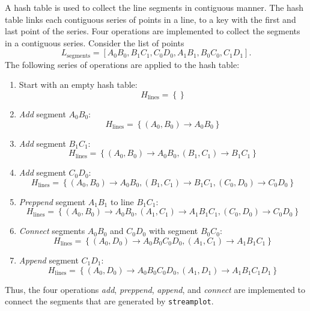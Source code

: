 \documentclass[english, a4paper]{article}
\begin{document}
A hash table is used to collect the line segments in contiguous manner. The hash table links each contiguous series of points in a line, to a key with the first and last point of the series. Four operations are implemented to collect the segments in a contiguous series. Consider the list of points
\begin{equation}
	L_{\mathrm{segments}} = \left[ A_{0}B_{0}, B_{1} C_{1}, C_{0}D_{0}, A_{1}B_{1}, B_{0}C_{0}, C_{1} D_{1} \right].
\end{equation}
The following series of operations are applied to the hash table:
\begin{enumerate}
\item Start with an empty hash table:
	\begin{equation}
		H_{\mathrm{lines}} = \left\{ \right\}
	\end{equation}
\item \emph{Add} segment $A_{0} B_{0}$:
	\begin{equation}
		H_{\mathrm{lines}} = \left\{ (A_{0}, B_{0}) \to A_{0} B_{0} \right\}
	\end{equation}
\item \emph{Add} segment $B_{1} C_{1}$:
	\begin{equation}
		H_{\mathrm{lines}} = \left\{ (A_{0}, B_{0}) \to A_{0} B_{0}, (B_{1}, C_{1}) \to B_{1} C_{1} \right\}
	\end{equation}
\item \emph{Add} segment $C_{0} D_{0}$:
	\begin{equation}
		H_{\mathrm{lines}} = \left\{ (A_{0}, B_{0}) \to A_{0} B_{0}, (B_{1}, C_{1}) \to B_{1} C_{1}, (C_{0}, D_{0}) \to C_{0} D_{0} \right\}
	\end{equation}
\item \emph{Preppend} segment $A_{1} B_{1}$ to line $B_{1} C_{1}$:
	\begin{equation}
		H_{\mathrm{lines}} = \left\{ (A_{0}, B_{0}) \to A_{0} B_{0}, (A_{1}, C_{1}) \to A_{1} B_{1} C_{1}, (C_{0}, D_{0}) \to C_{0} D_{0} \right\}
	\end{equation}
\item \emph{Connect} segments $A_{0} B_{0}$ and $C_{0} D_{0}$ with segment $B_{0} C_{0}$:
	\begin{equation}
		H_{\mathrm{lines}} = \left\{ (A_{0}, D_{0}) \to A_{0} B_{0} C_{0} D_{0}, (A_{1}, C_{1}) \to A_{1} B_{1} C_{1} \right\}
	\end{equation}
\item \emph{Append} segment $C_{1} D_{1}$:
	\begin{equation}
		H_{\mathrm{lines}} = \left\{ (A_{0}, D_{0}) \to A_{0} B_{0} C_{0} D_{0}, (A_{1}, D_{1}) \to A_{1} B_{1} C_{1} D_{1} \right\}
	\end{equation}
\end{enumerate}
Thus, the four operations \emph{add}, \emph{preppend}, \emph{append}, and \emph{connect} are implemented to connect the segments that are generated by \texttt{streamplot}.
\end{document}
